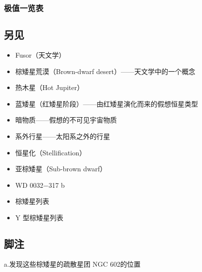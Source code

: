 \subsubsection{极值一览表}
\subsection{另见}
\begin{itemize}
\item Fusor（天文学）
\item 棕矮星荒漠（Brown-dwarf desert）——天文学中的一个概念
\item 热木星（Hot Jupiter）
\item 蓝矮星（红矮星阶段）——由红矮星演化而来的假想恒星类型
\item 暗物质——假想的不可见宇宙物质
\item 系外行星——太阳系之外的行星
\item 恒星化（Stellification）
\item 亚棕矮星（Sub-brown dwarf）
\item WD 0032−317 b
\item 棕矮星列表
\item Y 型棕矮星列表
\end{itemize}
\subsection{脚注}
a.发现这些棕矮星的疏散星团 NGC 602的位置
